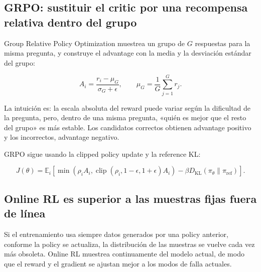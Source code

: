
\subsection{GRPO: sustituir el critic por una recompensa relativa dentro del grupo}

Group Relative Policy Optimization muestrea un grupo de $G$ respuestas para la misma pregunta, y construye el advantage con la media y la desviación estándar del grupo:

$$
A_i=\frac{r_i-\mu_G}{\sigma_G+\epsilon},
\qquad
\mu_G=\frac{1}{G}\sum_{j=1}^{G}r_j.
$$


La intuición es: la escala absoluta del reward puede variar según la dificultad de la pregunta, pero, dentro de una misma pregunta, «quién es mejor que el resto del grupo» es más estable. Los candidatos correctos obtienen advantage positivo y los incorrectos, advantage negativo.

GRPO sigue usando la clipped policy update y la reference KL:

$$
J(\theta)=\mathbb E_i\left[
\min(\rho_i A_i,\operatorname{clip}(\rho_i,1-\epsilon,1+\epsilon)A_i)
-\beta D_{\mathrm{KL}}(\pi_\theta\|\pi_{\mathrm{ref}})
\right].
$$


\subsection{Online RL es superior a las muestras fijas fuera de línea}

Si el entrenamiento usa siempre datos generados por una policy anterior, conforme la policy se actualiza, la distribución de las muestras se vuelve cada vez más obsoleta. Online RL muestrea continuamente del modelo actual, de modo que el reward y el gradient se ajustan mejor a los modos de falla actuales.


